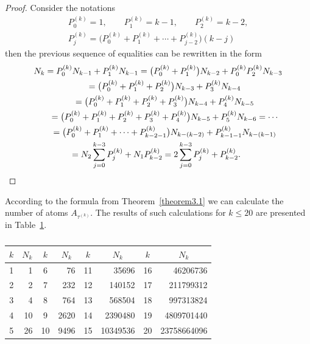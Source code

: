 \documentclass[10pt,a4paper]{amsart}
\numberwithin{equation}{section}
\begin{document}
\begin{proof}
Consider the notations
\begin{gather*}
P_{0}^{(k)}=1, \qquad P_{1}^{(k)}=k-1, \qquad P_{2}^{(k)}=k-2,\\
P_{j}^{(k)}=\big(P_{0}^{(k)}+P_{1}^{(k)}+\cdots+P_{j-2}^{(k)}\big)(k-j)
\end{gather*} then the previous sequence of equalities can be rewritten in the form
\begin{gather*}
N_{k}= P_{0}^{(k)} N_{k-1}+P_{1}^{(k)} N_{k-1} = \big(P_{0}^{(k)}+P_{1}^{(k)}\big) N_{k-2}+P_{0}^{(k)}P_{2}^{(k)} N_{k-3}\\
\hphantom{N_{k}}{} = \big(P_{0}^{(k)}+P_{1}^{(k)}+P_{2}^{(k)}\big) N_{k-3}+P_{3}^{(k)} N_{k-4}\\
\hphantom{N_{k}}{} = \big(P_{0}^{(k)}+P_{1}^{(k)}+P_{2}^{(k)}+P_{3}^{(k)}\big) N_{k-4}+P_{4}^{(k)} N_{k-5}\\
\hphantom{N_{k}}{} = \big(P_{0}^{(k)}+P_{1}^{(k)}+P_{2}^{(k)}+P_{3}^{(k)}+P_{4}^{(k)}\big) N_{k-5}+P_{5}^{(k)} N_{k-6}= \cdots\\
\hphantom{N_{k}}{} = \big(P_{0}^{(k)}+P_{1}^{(k)}+\cdots+P_{k-2-1}^{(k)}\big) N_{k-(k-2)}+P_{k-1-1}^{(k)} N_{k-(k-1)}\\
\hphantom{N_{k}}{} = N_{2} \sum_{j=0}^{k-3}P_{j}^{(k)}+N_{1} P_{k-2}^{(k)}= 2 \sum_{j=0}^{k-3}P_{j}^{(k)}+P_{k-2}^{(k)}.\tag*{\qed}
\end{gather*}\renewcommand{\qed}{}
\end{proof}

According to the formula from Theorem~\ref{theorem3.1} we can calculate the number of atoms $A_{\tau^{(k)}}$. The results of such calculations for $k\leq20$ are presented in Table~\ref{table1}.
\begin{table}[h!]\centering
\caption{}\label{table1}\vspace{1mm}

\begin{tabular}{|c|r|c|r|c|r|c|r|}
\hline
$k$ & \multicolumn{1}{|c|}{$N_{k}$} & $k$ & \multicolumn{1}{|c|}{$N_{k}$} & $k$ & \multicolumn{1}{|c|}{$N_{k}$} & $k$ & \multicolumn{1}{|c|}{$N_{k}$} \\
\hline
1 & 1 & \hphantom{1}6 & 76 & 11 & 35696 & 16 & 46206736\\
2 & 2 & \hphantom{1}7 & 232 & 12 & 140152 & 17 & 211799312\\
3 & 4 & \hphantom{1}8 & 764 & 13 & 568504 & 18 & 997313824\\
4 & 10 & \hphantom{1}9 & 2620 & 14 & 2390480 & 19 & 4809701440\\
5 & 26 & 10 & 9496 & 15 & 10349536 & 20 & 23758664096\\
\hline
\end{tabular}
\end{table}
\end{document}
